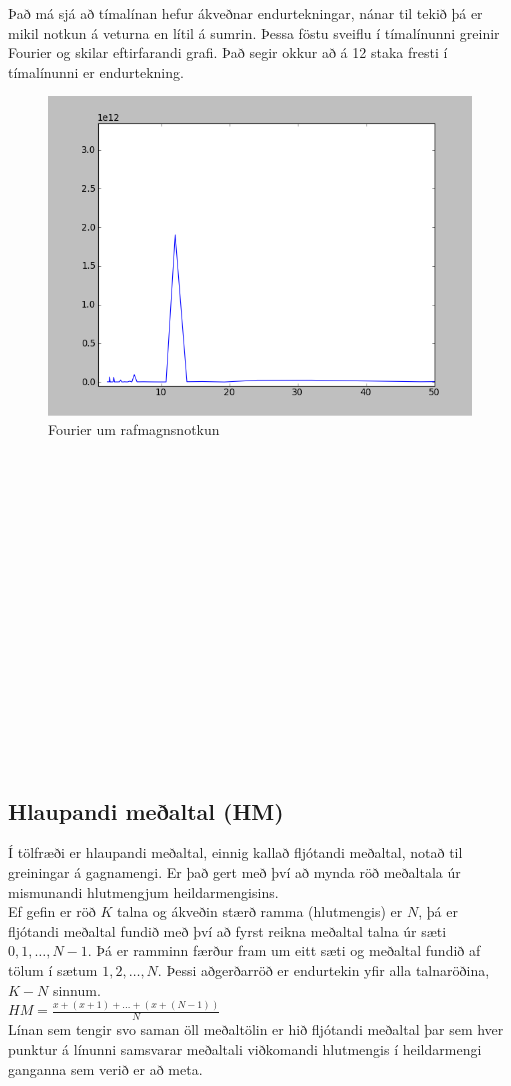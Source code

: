 \documentclass[11pt]{article}
\begin{document}
Það má sjá að tímalínan hefur ákveðnar endurtekningar, nánar til tekið þá er mikil notkun á veturna en lítil á sumrin.
Þessa föstu sveiflu í tímalínunni greinir Fourier og skilar eftirfarandi grafi. 
Það segir okkur að á 12 staka fresti í tímalínunni er endurtekning.
\begin{figure}
 \begin{center}
 \includegraphics[width=.45\textwidth]{Fourier.png}
 \caption{Fourier um rafmagnsnotkun}
  \end{center}
\end{figure}
\hfill
\\\\\\\\\\\\\\\\\\\\\\\\\\\\\\\

\subsection{Hlaupandi meðaltal (HM)}
Í tölfræði er hlaupandi meðaltal, einnig kallað fljótandi meðaltal, notað til greiningar á gagnamengi. 
Er það gert með því að mynda röð meðaltala úr mismunandi hlutmengjum heildarmengisins.\\
Ef gefin er röð $K$ talna og ákveðin stærð ramma (hlutmengis) er $N$, þá er fljótandi meðaltal fundið með því að fyrst reikna meðaltal 
talna úr sæti $0,1,\dots,N-1$. Þá er ramminn færður fram um eitt sæti og meðaltal fundið af tölum í sætum $1,2,\dots,N$. 
Þessi aðgerðarröð er endurtekin yfir alla talnaröðina, $K-N$ sinnum.  \\
$HM = \frac{x+(x+1)+\dots+(x+(N-1))}{N}$
\\
Línan sem tengir svo saman öll meðaltölin er hið fljótandi meðaltal þar sem hver punktur á línunni samsvarar 
meðaltali viðkomandi hlutmengis í heildarmengi ganganna sem verið er að meta. 
 
\end{document}
